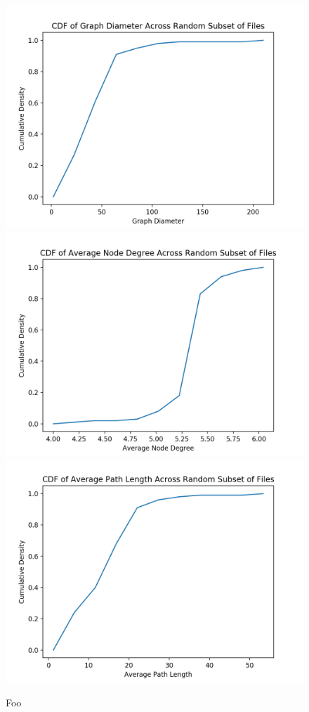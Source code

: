\begin{figure}
  \centering
  \includegraphics[width=\linewidth]{img/diameter}
  \includegraphics[width=\linewidth]{img/node_degree}
  \includegraphics[width=\linewidth]{img/path_length}
  \caption{Foo}
  \label{fig:dataset-graph-stats}
\end{figure}


